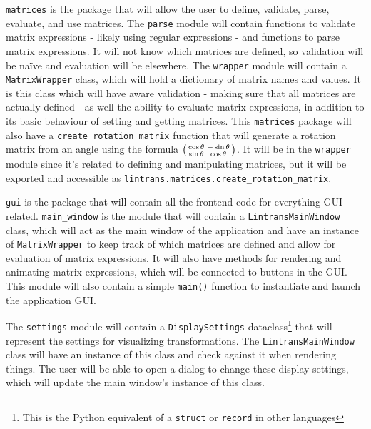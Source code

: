 \documentclass[../main.tex]{subfiles}
\begin{document}
\texttt{matrices} is the package that will allow the user to define, validate, parse, evaluate, and use matrices. The \texttt{parse} module will contain functions to validate matrix expressions - likely using regular expressions - and functions to parse matrix expressions. It will not know which matrices are defined, so validation will be na\"{i}ve and evaluation will be elsewhere. The \texttt{wrapper} module will contain a \texttt{MatrixWrapper} class, which will hold a dictionary of matrix names and values. It is this class which will have aware validation - making sure that all matrices are actually defined - as well the ability to evaluate matrix expressions, in addition to its basic behaviour of setting and getting matrices. This \texttt{matrices} package will also have a \texttt{create\_rotation\_matrix} function that will generate a rotation matrix from an angle using the formula $\begin{psmallmatrix}\cos\theta & -\sin\theta\\\sin\theta & \cos\theta\end{psmallmatrix}$. It will be in the \texttt{wrapper} module since it's related to defining and manipulating matrices, but it will be exported and accessible as \texttt{lintrans.matrices.create\_rotation\_matrix}.

\texttt{gui} is the package that will contain all the frontend code for everything GUI-related. \texttt{main\_window} is the module that will contain a \texttt{LintransMainWindow} class, which will act as the main window of the application and have an instance of \texttt{MatrixWrapper} to keep track of which matrices are defined and allow for evaluation of matrix expressions. It will also have methods for rendering and animating matrix expressions, which will be connected to buttons in the GUI. This module will also contain a simple \texttt{main()} function to instantiate and launch the application GUI.

The \texttt{settings} module will contain a \texttt{DisplaySettings} dataclass\footnote{This is the Python equivalent of a \texttt{struct} or \texttt{record} in other languages} that will represent the settings for visualizing transformations. The \texttt{LintransMainWindow} class will have an instance of this class and check against it when rendering things. The user will be able to open a dialog to change these display settings, which will update the main window's instance of this class.
\end{document}
